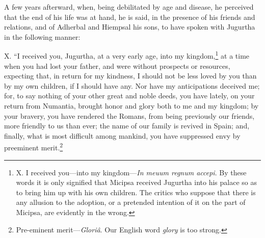 A few years afterward, when, being debilitated by age and disease, he
perceived that the end of his life was at hand, he is said, in the
presence of his friends and relations, and of Adherbal and Hiempsal
his sons, to have spoken with Jugurtha in the following manner:

X. ``I received you, Jugurtha, at a very early age, into my kingdom,\footnote{X. I received you—into my kingdom—\emph{In meuum regnum accepi}.
By these words it is only signified that Micipsa received Jugurtha
into his palace so as to bring him up with his own children. The
critics who suppose that there is any allusion to the adoption, or
a pretended intention of it on the part of Micipsa, are evidently in
the wrong.}
at a time when you had lost your father, and were without prospects or
resources, expecting that, in return for my kindness, I should not be
less loved by you than by my own children, if I should have any. Nor
have my anticipations deceived me; for, to say nothing of your other
great and noble deeds, you have lately, on your return from Numantia,
brought honor and glory both to me and my kingdom; by your bravery,
you have rendered the Romans, from being previously our friends, more
friendly to us than ever; the name of our family is revived in Spain;
and, finally, what is most difficult among mankind, you have suppressed
envy by preeminent merit.\footnote{Pre-eminent merit—\emph{Gloriâ}. Our English word \emph{glory} is too
strong.}

